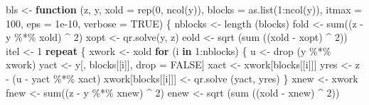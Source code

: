 \documentclass[
  12pt,
]{book}
\newenvironment{Shaded}{\begin{snugshade}}{\end{snugshade}}
\newcommand{\AttributeTok}[1]{\textcolor[rgb]{0.77,0.63,0.00}{#1}}
\newcommand{\ConstantTok}[1]{\textcolor[rgb]{0.00,0.00,0.00}{#1}}
\newcommand{\ControlFlowTok}[1]{\textcolor[rgb]{0.13,0.29,0.53}{\textbf{#1}}}
\newcommand{\DecValTok}[1]{\textcolor[rgb]{0.00,0.00,0.81}{#1}}
\newcommand{\FloatTok}[1]{\textcolor[rgb]{0.00,0.00,0.81}{#1}}
\newcommand{\FunctionTok}[1]{\textcolor[rgb]{0.00,0.00,0.00}{#1}}
\newcommand{\NormalTok}[1]{#1}
\newcommand{\OtherTok}[1]{\textcolor[rgb]{0.56,0.35,0.01}{#1}}
\newcommand{\SpecialCharTok}[1]{\textcolor[rgb]{0.00,0.00,0.00}{#1}}
\begin{document}
\begin{Shaded}
\begin{Highlighting}[]
\NormalTok{bls }\OtherTok{\textless{}{-}}
  \ControlFlowTok{function}\NormalTok{ (z,}
\NormalTok{            y,}
            \AttributeTok{xold =} \FunctionTok{rep}\NormalTok{(}\DecValTok{0}\NormalTok{, }\FunctionTok{ncol}\NormalTok{(y)),}
            \AttributeTok{blocks =} \FunctionTok{as.list}\NormalTok{(}\DecValTok{1}\SpecialCharTok{:}\FunctionTok{ncol}\NormalTok{(y)),}
            \AttributeTok{itmax =} \DecValTok{100}\NormalTok{,}
            \AttributeTok{eps =} \FloatTok{1e{-}10}\NormalTok{,}
            \AttributeTok{verbose =} \ConstantTok{TRUE}\NormalTok{) \{}
\NormalTok{    nblocks }\OtherTok{\textless{}{-}} \FunctionTok{length}\NormalTok{ (blocks)}
\NormalTok{    fold }\OtherTok{\textless{}{-}} \FunctionTok{sum}\NormalTok{((z }\SpecialCharTok{{-}}\NormalTok{ y }\SpecialCharTok{\%*\%}\NormalTok{ xold) }\SpecialCharTok{\^{}} \DecValTok{2}\NormalTok{)}
\NormalTok{    xopt }\OtherTok{\textless{}{-}} \FunctionTok{qr.solve}\NormalTok{(y, z)}
\NormalTok{    eold }\OtherTok{\textless{}{-}} \FunctionTok{sqrt}\NormalTok{ (}\FunctionTok{sum}\NormalTok{ ((xold }\SpecialCharTok{{-}}\NormalTok{ xopt) }\SpecialCharTok{\^{}} \DecValTok{2}\NormalTok{))}
\NormalTok{    itel }\OtherTok{\textless{}{-}} \DecValTok{1}
    \ControlFlowTok{repeat}\NormalTok{ \{}
\NormalTok{      xwork }\OtherTok{\textless{}{-}}\NormalTok{ xold}
      \ControlFlowTok{for}\NormalTok{ (i }\ControlFlowTok{in} \DecValTok{1}\SpecialCharTok{:}\NormalTok{nblocks) \{}
\NormalTok{        u }\OtherTok{\textless{}{-}} \FunctionTok{drop}\NormalTok{ (y }\SpecialCharTok{\%*\%}\NormalTok{ xwork)}
\NormalTok{        yact }\OtherTok{\textless{}{-}}\NormalTok{ y[, blocks[[i]], drop }\OtherTok{=} \ConstantTok{FALSE}\NormalTok{]}
\NormalTok{        xact }\OtherTok{\textless{}{-}}\NormalTok{ xwork[blocks[[i]]]}
\NormalTok{        yres }\OtherTok{\textless{}{-}}\NormalTok{ z }\SpecialCharTok{{-}}\NormalTok{ (u }\SpecialCharTok{{-}}\NormalTok{ yact }\SpecialCharTok{\%*\%}\NormalTok{ xact)}
\NormalTok{        xwork[blocks[[i]]] }\OtherTok{\textless{}{-}} \FunctionTok{qr.solve}\NormalTok{ (yact, yres)}
\NormalTok{      \}}
\NormalTok{      xnew }\OtherTok{\textless{}{-}}\NormalTok{ xwork}
\NormalTok{      fnew }\OtherTok{\textless{}{-}} \FunctionTok{sum}\NormalTok{((z }\SpecialCharTok{{-}}\NormalTok{ y }\SpecialCharTok{\%*\%}\NormalTok{ xnew) }\SpecialCharTok{\^{}} \DecValTok{2}\NormalTok{)}
\NormalTok{      enew }\OtherTok{\textless{}{-}} \FunctionTok{sqrt}\NormalTok{ (}\FunctionTok{sum}\NormalTok{ ((xold }\SpecialCharTok{{-}}\NormalTok{ xnew) }\SpecialCharTok{\^{}} \DecValTok{2}\NormalTok{))}

\end{Highlighting}
\end{Shaded}
\end{document}

